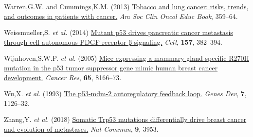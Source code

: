 \begin{CSLReferences}{1}{0}
\leavevmode{}%
Warren,G.W. and Cummings,K.M. (2013) \href{https://doi.org/10.14694/edbook_am.2013.33.359}{Tobacco and lung cancer: risks, trends, and outcomes in patients with cancer.} \emph{Am Soc Clin Oncol Educ Book}, 359--64.

\leavevmode{}%
Weissmueller,S. \emph{et al.} (2014) \href{https://doi.org/10.1016/j.cell.2014.01.066}{Mutant p53 drives pancreatic cancer metastasis through cell-autonomous PDGF receptor β signaling.} \emph{Cell}, \textbf{157}, 382--394.

\leavevmode{}%
Wijnhoven,S.W.P. \emph{et al.} (2005) \href{https://doi.org/10.1158/0008-5472.can-05-1650}{Mice expressing a mammary gland-specific R270H mutation in the p53 tumor suppressor gene mimic human breast cancer development.} \emph{Cancer Res}, \textbf{65}, 8166--73.

\leavevmode{}%
Wu,X. \emph{et al.} (1993) \href{https://doi.org/10.1101/gad.7.7a.1126}{The p53-mdm-2 autoregulatory feedback loop.} \emph{Genes Dev}, \textbf{7}, 1126--32.

\leavevmode{}%
Zhang,Y. \emph{et al.} (2018) \href{https://doi.org/10.1038/s41467-018-06146-9}{Somatic Trp53 mutations differentially drive breast cancer and evolution of metastases.} \emph{Nat Commun}, \textbf{9}, 3953.

\end{CSLReferences}
